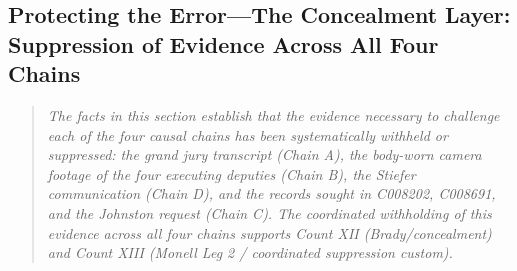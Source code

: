 \documentclass[12pt,letterpaper]{article}
\begin{document}
	\subsection*{Protecting the Error---The Concealment Layer: Suppression of Evidence Across All Four Chains}
	\begin{quote}
		\textit{The facts in this section establish that the evidence
			necessary to challenge each of the four causal chains has been
			systematically withheld or suppressed: the grand jury
			transcript (Chain A), the body-worn camera footage of the four
			executing deputies (Chain B), the Stiefer communication (Chain
			D), and the records sought in C008202, C008691, and the
			Johnston request (Chain C). The coordinated withholding of
			this evidence across all four chains supports Count XII
			(Brady/concealment) and Count XIII (Monell Leg 2 / coordinated
			suppression custom).}
	\end{quote}
\end{document}
